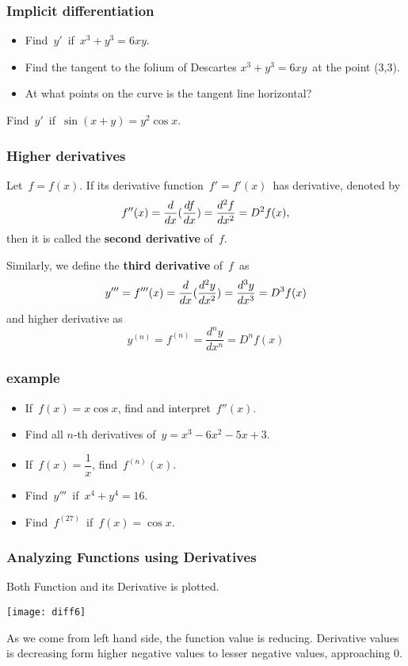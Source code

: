  \begin{frame}[fragile] \frametitle{Implicit differentiation}

\begin{itemize}
	\item Find\ $y'$\ if\ $x^3+y^3=6xy$.
	\item Find the tangent to the folium of Descartes\; $x^3+y^3=6xy$\ at the point (3,3).
	\item At what points on the curve is the tangent line horizontal?
\end{itemize}


Find\ $y'$\ if\ $\sin (x+y) = y^2 \cos x$.
\end{frame}

 \begin{frame}[fragile] \frametitle{Higher derivatives}
Let\ $f=f(x)$. If its derivative function\ $f'=f'(x)$\ has derivative, denoted by
{\[ f''(x) = \frac{d {} }{d x} (\frac{d {f} }{d x}) = \frac{d^2 {f} }{d x^2} = D^2 f(x),\]}
then it is called the {\bf second derivative} of\ $f$.

Similarly, we define the {\bf third derivative} of\ $f$\ as
{\[ y'''=f'''(x)=\frac{d {} }{d x} (\frac{d^2 {y} }{d x^2})=\frac{d^3 y}{dx^3} = D^3f(x)\]}
and {higher derivative} as
{\[ y^{(n)}=f^{(n)}=\frac{d^n y}{dx^n} = D^n f(x)\]}
\end{frame}

 \begin{frame}[fragile] \frametitle{example}
\begin{itemize}
	\item If\ $f(x)=x \cos x$, find and interpret\ $f''(x)$.
	\item Find all $n$-th derivatives of\ $y=x^3-6x^2-5x+3$.\\
	\item If\ $f(x)=\dfrac{1}{x}$, find\ $f^{(n)}(x)$. 
	\item Find\ $y'''$\ if\ $x^4+y^4=16$.  \\
	\item Find\ $f^{(27)}$\ if\ $f(x)=\cos x$.
\end{itemize}
\end{frame}

 \begin{frame}[fragile] \frametitle{Analyzing Functions using Derivatives}
 Both Function and its Derivative is plotted.
\begin{center}
\texttt{[image: diff6]}
\end{center}
As we come from left hand side, the function value is reducing. Derivative values is decreasing form higher negative values to lesser negative values, approaching 0.
\end{frame}

